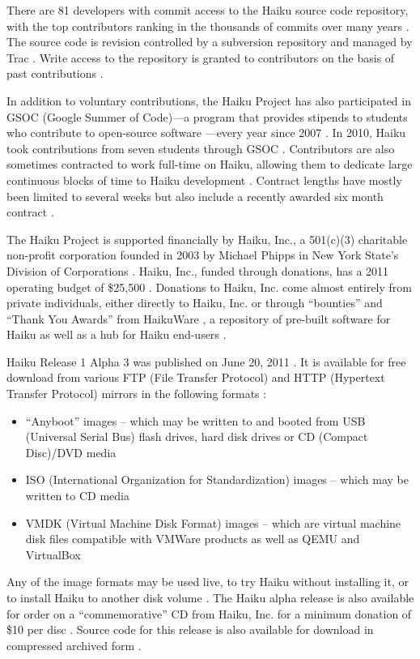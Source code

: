 \documentclass{article}
\begin{document}
There are 81 developers with commit access to the Haiku source code
repository, with the top contributors ranking in the thousands of
commits over many years \cite{HaikuContrib}.  The source code is
revision controlled by a subversion repository and managed by Trac
\cite{HaikuDevStart}.  Write access to the repository is granted to
contributors on the basis of past contributions \cite{HaikuDevStart}.

In addition to voluntary contributions, the Haiku Project has also
participated in GSOC (Google Summer of Code)---a program that provides
stipends to students who contribute to open-source software
\cite{GSOCWiki}---every year since 2007 \cite{HaikuGSOC}.  In 2010,
Haiku took contributions from seven students through GSOC
\cite{HaikuGSOC2010}.  Contributors are also sometimes contracted to
work full-time on Haiku, allowing them to dedicate large continuous
blocks of time to Haiku development \cite{HaikuIncContracts}.
Contract lengths have mostly been limited to several weeks but also
include a recently awarded six month contract
\cite{HaikuLongContract}.

The Haiku Project is supported financially by Haiku, Inc., a 501(c)(3)
charitable non-profit corporation founded in 2003 by Michael Phipps in
New York State's Division of Corporations \cite{HaikuIncAbout,
HaikuInc}.  Haiku, Inc., funded through donations, has a 2011
operating budget of \$25,500 \cite{HaikuIncDocs}.  Donations to Haiku,
Inc. come almost entirely from private individuals, either directly to
Haiku, Inc. or through ``bounties'' and ``Thank You Awards'' from
HaikuWare \cite{HaikuIncDonors, HaikuWareBounties}, a repository of
pre-built software for Haiku as well as a hub for Haiku end-users
\cite{HaikuWareAbout}.

Haiku Release 1 Alpha 3 was published on June 20, 2011
\cite{HaikuRelease}.  It is available for free download from various
FTP (File Transfer Protocol) and HTTP (Hypertext Transfer Protocol)
mirrors in the following formats \cite{HaikuGet}:
\begin{itemize}
\item ``Anyboot'' images -- which may be written to and booted from
  USB (Universal Serial Bus) flash drives, hard disk drives or CD
  (Compact Disc)/DVD media
\item ISO (International Organization for Standardization) images
  -- which may be written to CD media
\item VMDK (Virtual Machine Disk Format) images -- which are virtual
  machine disk files compatible with VMWare products as well as QEMU
  and VirtualBox \cite{VMDKWiki}
\end{itemize}
Any of the image formats may be used live, to try Haiku without
installing it, or to install Haiku to another disk volume
\cite{HaikuGet}.  The Haiku alpha release is also available for order
on a ``commemorative'' CD from Haiku, Inc. for a minimum donation of
\$10 per disc \cite{HaikuIncOrder}.  Source code for this release is
also available for download in compressed archived form
\cite{HaikuR1A3Src}.
\end{document}
